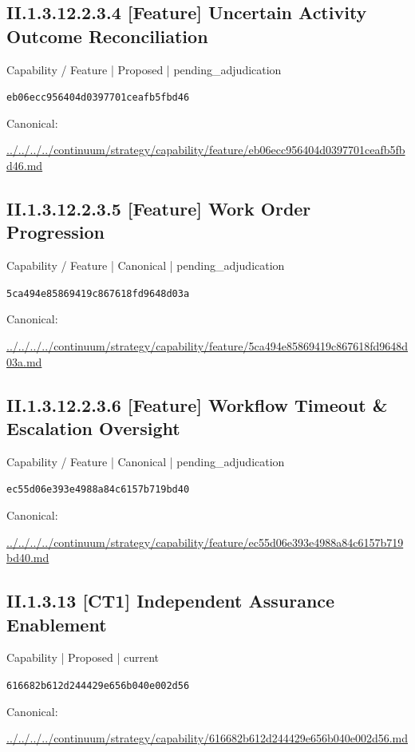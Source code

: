 \documentclass[10pt,a4paper]{article}
\begin{document}
\subsection*{II.1.3.12.2.3.4 [Feature] Uncertain Activity Outcome Reconciliation}
{\small Capability / Feature | Proposed | pending\_adjudication}\par
\texttt{eb06ecc956404d0397701ceafb5fbd46}\par
Canonical: \par
{\footnotesize\url{../../../../continuum/strategy/capability/feature/eb06ecc956404d0397701ceafb5fbd46.md}}\par
\subsection*{II.1.3.12.2.3.5 [Feature] Work Order Progression}
{\small Capability / Feature | Canonical | pending\_adjudication}\par
\texttt{5ca494e85869419c867618fd9648d03a}\par
Canonical: \par
{\footnotesize\url{../../../../continuum/strategy/capability/feature/5ca494e85869419c867618fd9648d03a.md}}\par
\subsection*{II.1.3.12.2.3.6 [Feature] Workflow Timeout \& Escalation Oversight}
{\small Capability / Feature | Canonical | pending\_adjudication}\par
\texttt{ec55d06e393e4988a84c6157b719bd40}\par
Canonical: \par
{\footnotesize\url{../../../../continuum/strategy/capability/feature/ec55d06e393e4988a84c6157b719bd40.md}}\par
\subsection*{II.1.3.13 [CT1] Independent Assurance Enablement}
{\small Capability | Proposed | current}\par
\texttt{616682b612d244429e656b040e002d56}\par
Canonical: \par
{\footnotesize\url{../../../../continuum/strategy/capability/616682b612d244429e656b040e002d56.md}}\par
\end{document}
